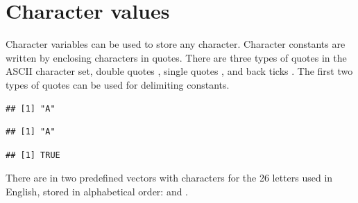\documentclass[krantz2]{krantz}\usepackage{knitr}%
\begin{document}
\section{Character values}\label{sec:calc:character}
Character variables can be used to store any character. Character constants are written by enclosing characters in quotes. There are three types of quotes in the ASCII character set, double quotes , single quotes , and back ticks . The first two types of quotes can be used for delimiting  constants.

\begin{knitrout}\footnotesize
{}\color{fgcolor}\begin{kframe}
\begin{alltt}
 \hlkwb{<-} 
\end{alltt}
\begin{verbatim}
## [1] "A"
\end{verbatim}
\begin{alltt}
 \hlkwb{<-} 
\end{alltt}
\begin{verbatim}
## [1] "A"
\end{verbatim}
\begin{alltt}
 \hlopt{==} 
\end{alltt}
\begin{verbatim}
## [1] TRUE
\end{verbatim}
\end{kframe}
\end{knitrout}

There are in \Rlang two predefined vectors with characters for the 26 letters used in English, stored in alphabetical order:  and .
\end{document}

